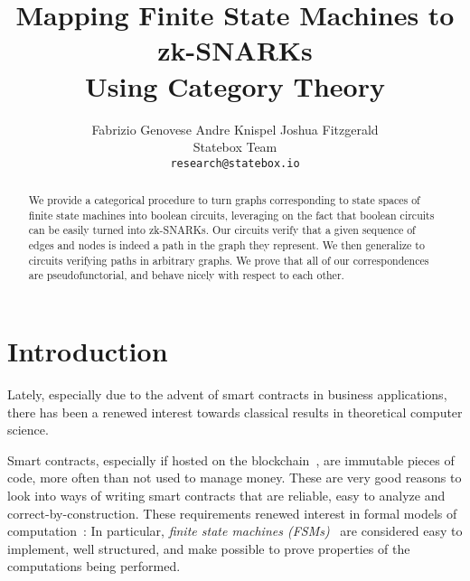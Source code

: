 \documentclass[preliminary,copyright,creativecommons,sharealike,noncommercial]{eptcs}
\title{Mapping Finite State Machines to zk-SNARKs \\ Using Category Theory}
\author{
	Fabrizio Genovese \hspace{1em} Andre Knispel \hspace{1em} Joshua Fitzgerald \\
	Statebox Team\\
	\texttt{research@statebox.io}
}
\begin{document}
\maketitle
%
%
\begin{abstract}
  We provide a categorical procedure to turn graphs corresponding to 
  state spaces of finite state machines into boolean circuits, leveraging on the fact that 
  boolean circuits can be easily turned into zk-SNARKs. Our 
  circuits verify that a given sequence of edges and nodes is indeed a 
  path in the graph they represent. We then generalize to circuits verifying 
  paths in arbitrary graphs. We prove that all of our correspondences are 
  pseudofunctorial, and behave nicely with respect to each other.
\end{abstract}
%
%
%
\section{Introduction}\label{sec:introduction}
%
%
Lately, especially due to the advent of smart contracts 
in business applications, there has been a renewed interest towards 
classical results in theoretical computer science.

Smart contracts, especially if hosted on the blockchain~\cite{Nakamoto2008, Buterin2014}, are immutable
pieces of code, more often than not used to manage money. These are 
very good reasons to look into ways of writing smart contracts  
that are reliable, easy to analyze and correct-by-construction. These requirements
 renewed interest in formal models of computation~\cite{Rosu2018}: In particular, 
 \emph{finite state machines (FSMs)}~\cite{Mavridou2017} are considered easy 
 to implement, well structured, and make possible to prove 
 properties of the computations being performed. 
\end{document}
